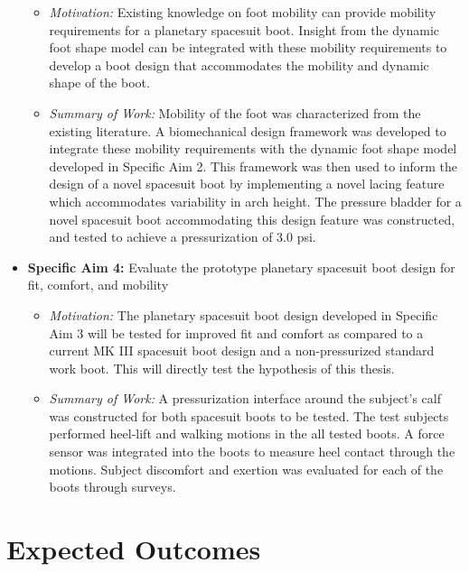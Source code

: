 \documentclass[defaultstyle,11pt]{comps}
\providecommand{\tightlist}{%
  \setlength{\itemsep}{0pt}\setlength{\parskip}{0pt}}
\begin{document}
\begin{itemize}
  \begin{itemize}
  \tightlist
  \item
    \emph{Motivation:} Existing knowledge on foot mobility can provide mobility requirements for a planetary spacesuit boot.
    Insight from the dynamic foot shape model can be integrated with these mobility requirements to develop a boot design that accommodates the mobility and dynamic shape of the boot.
  \item
    \emph{Summary of Work:} Mobility of the foot was characterized from the existing literature.
    A biomechanical design framework was developed to integrate these mobility requirements with the dynamic foot shape model developed in Specific Aim 2.
    This framework was then used to inform the design of a novel spacesuit boot by implementing a novel lacing feature which accommodates variability in arch height.
    The pressure bladder for a novel spacesuit boot accommodating this design feature was constructed, and tested to achieve a pressurization of 3.0 psi.
  \end{itemize}
\item
  \textbf{Specific Aim 4:} Evaluate the prototype planetary spacesuit boot design for fit, comfort, and mobility

  \begin{itemize}
  \tightlist
  \item
    \emph{Motivation:} The planetary spacesuit boot design developed in Specific Aim 3 will be tested for improved fit and comfort as compared to a current MK III spacesuit boot design and a non-pressurized standard work boot.
    This will directly test the hypothesis of this thesis.
  \item
    \emph{Summary of Work:} A pressurization interface around the subject's calf was constructed for both spacesuit boots to be tested.
    The test subjects performed heel-lift and walking motions in the all tested boots.
    A force sensor was integrated into the boots to measure heel contact through the motions.
    Subject discomfort and exertion was evaluated for each of the boots through surveys.
  \end{itemize}
\end{itemize}

\hypertarget{expected-outcomes}{%
\section{Expected Outcomes}\label{expected-outcomes}}
\end{document}
